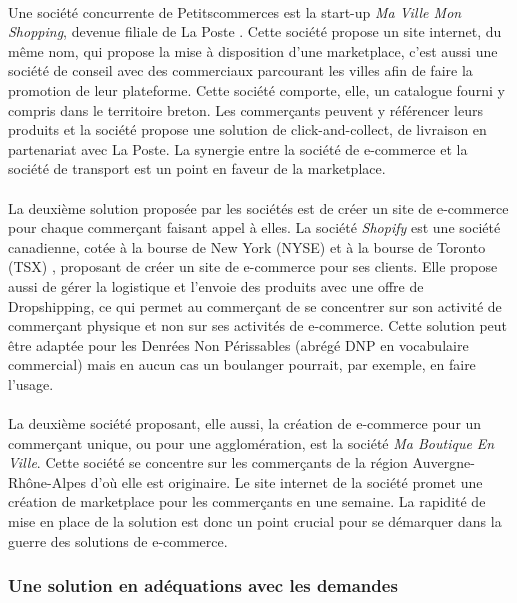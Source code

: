 \documentclass[a4paper, 12pt]{article}
\begin{document}
\paragraph{}Une société concurrente de Petitscommerces est la start-up \textit{Ma Ville Mon Shopping}, devenue filiale de La Poste \cite{mavillemonshopping}. Cette société propose un site internet, du même nom, qui propose la mise à disposition d’une marketplace, c’est aussi une société de conseil avec des commerciaux parcourant les villes afin de faire la promotion de leur plateforme. Cette société comporte, elle, un catalogue fourni y compris dans le territoire breton. Les commerçants peuvent y référencer leurs produits et la société propose une solution de click-and-collect, de livraison en partenariat avec La Poste. La synergie entre la société de e-commerce et la société de transport est un point en faveur de la marketplace.
\paragraph{}La deuxième solution proposée par les sociétés est de créer un site de e-commerce pour chaque commerçant faisant appel à elles. La société \textit{Shopify} est une société canadienne, cotée à la bourse de New York (NYSE) et à la bourse de Toronto (TSX) \cite{shopify}, proposant de créer un site de e-commerce pour ses clients. Elle propose aussi de gérer la logistique et l’envoie des produits avec une offre de Dropshipping, ce qui permet au commerçant de se concentrer sur son activité de commerçant physique et non sur ses activités de e-commerce. Cette solution peut être adaptée pour les Denrées Non Périssables (abrégé DNP en vocabulaire commercial) mais en aucun cas un boulanger pourrait, par exemple, en faire l’usage.
\paragraph{}La deuxième société proposant, elle aussi, la création de e-commerce pour un commerçant unique, ou pour une agglomération, est la société \textit{Ma Boutique En Ville}. Cette société se concentre sur les commerçants de la région Auvergne-Rhône-Alpes d’où elle est originaire. Le site internet \cite{maboutiqueenville} de la société promet une création de marketplace pour les commerçants en une semaine. La rapidité de mise en place de la solution est donc un point crucial pour se démarquer dans la guerre des solutions de e-commerce.

\subsubsection{Une solution en adéquations avec les demandes}
\end{document}
